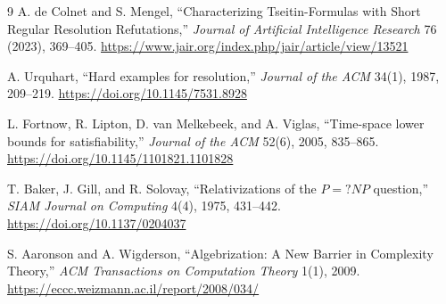 \documentclass[11pt]{article}
\begin{document}
\begin{thebibliography}{9}
A. de Colnet and S. Mengel,
``Characterizing Tseitin-Formulas with Short Regular Resolution Refutations,''
\emph{Journal of Artificial Intelligence Research} 76 (2023), 369--405.
\url{https://www.jair.org/index.php/jair/article/view/13521}

A. Urquhart,
``Hard examples for resolution,''
\emph{Journal of the ACM} 34(1), 1987, 209--219.
\url{https://doi.org/10.1145/7531.8928}

L. Fortnow, R. Lipton, D. van Melkebeek, and A. Viglas,
``Time-space lower bounds for satisfiability,''
\emph{Journal of the ACM} 52(6), 2005, 835--865.
\url{https://doi.org/10.1145/1101821.1101828}

T. Baker, J. Gill, and R. Solovay,
``Relativizations of the $P=?NP$ question,''
\emph{SIAM Journal on Computing} 4(4), 1975, 431--442.
\url{https://doi.org/10.1137/0204037}

S. Aaronson and A. Wigderson,
``Algebrization: A New Barrier in Complexity Theory,''
\emph{ACM Transactions on Computation Theory} 1(1), 2009.
\url{https://eccc.weizmann.ac.il/report/2008/034/}
\end{thebibliography}

\end{document}
